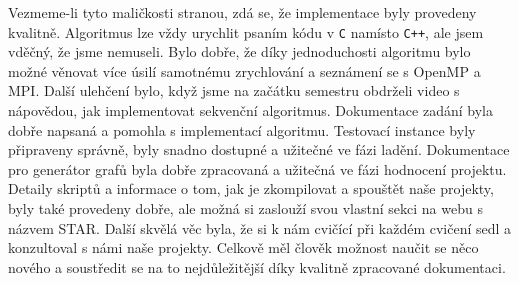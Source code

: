 Vezmeme-li tyto maličkosti stranou, zdá se, že implementace byly provedeny kvalitně.
Algoritmus lze vždy urychlit psaním kódu v \texttt{C} namísto \texttt{C++}, ale jsem vděčný, že jsme nemuseli.
Bylo dobře, že díky jednoduchosti algoritmu bylo možné věnovat více úsilí samotnému zrychlování a seznámení se s OpenMP a MPI.
Další ulehčení bylo, když jsme na začátku semestru obdrželi video s nápovědou, jak implementovat sekvenční algoritmus.
Dokumentace zadání byla dobře napsaná a pomohla s implementací algoritmu.
Testovací instance byly připraveny správně, byly snadno dostupné a užitečné ve fázi ladění.
Dokumentace pro generátor grafů byla dobře zpracovaná a užitečná ve fázi hodnocení projektu.
Detaily skriptů a informace o tom, jak je zkompilovat a spouštět naše projekty, byly také provedeny dobře, ale možná si zaslouží svou vlastní sekci na webu s názvem STAR.
Další skvělá věc byla, že si k nám cvičící při každém cvičení sedl a konzultoval s námi naše projekty.
Celkově měl člověk možnost naučit se něco nového a soustředit se na to nejdůležitější díky kvalitně zpracované dokumentaci.
